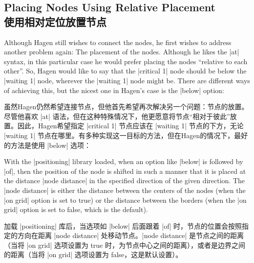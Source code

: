 
\subsection{Placing Nodes Using Relative Placement\\使用相对定位放置节点}

Although Hagen still wishes to connect the nodes, he first wishes to address
another problem again: The placement of the nodes. Although he likes the |at|
syntax, in this particular case he would prefer placing the nodes ``relative to
each other''. So, Hagen would like to say that the |critical 1| node should be
below the |waiting 1| node, wherever the |waiting 1| node might be. There are
different ways of achieving this, but the nicest one in Hagen's case is the
|below| option:

虽然Hagen仍然希望连接节点，但他首先希望再次解决另一个问题：节点的放置。尽管他喜欢 |at| 语法，但在这种特殊情况下，他更愿意将节点“相对于彼此”放置。因此，Hagen希望指定 |critical 1| 节点应该在 |waiting 1| 节点的下方，无论 |waiting 1| 节点在哪里。有多种实现这一目标的方法，但在Hagen的情况下，最好的方法是使用 |below| 选项：
%
\begin{codeexample}[preamble={\usetikzlibrary{positioning}}]
\end{codeexample}

With the |positioning| library loaded, when an option like |below| is followed
by |of|, then the position of the node is shifted in such a manner that it is
placed at the distance |node distance| in the specified direction of the given
direction. The |node distance| is either the distance between the centers of
the nodes (when the |on grid| option is set to true) or the distance between
the borders (when the |on grid| option is set to false, which is the default).

加载 |positioning| 库后，当选项如 |below| 后面跟着 |of| 时，节点的位置会按照指定的方向在距离 |node distance| 处移动节点。|node distance| 是节点之间的距离（当将 |on grid| 选项设置为 true 时，为节点中心之间的距离），或者是边界之间的距离（当将 |on grid| 选项设置为 false，这是默认设置）。

